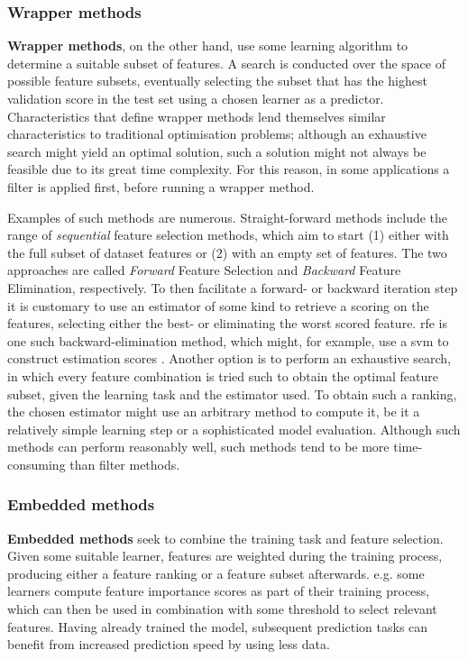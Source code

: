 \documentclass{article}
\begin{document}
\subsubsection{Wrapper methods}
\textbf{Wrapper methods}, on the other hand, use some learning algorithm to determine a suitable subset of features. A search is conducted over the space of possible feature subsets, eventually selecting the subset that has the highest validation score in the test set using a chosen learner as a predictor. Characteristics that define wrapper methods lend themselves similar characteristics to traditional optimisation problems; although an exhaustive search might yield an optimal solution, such a solution might not always be feasible due to its great time complexity. For this reason, in some applications a filter is applied first, before running a wrapper method.

Examples of such methods are numerous. Straight-forward methods include the range of \textit{sequential} feature selection methods, which aim to start (1) either with the full subset of dataset features or (2) with an empty set of features. The two approaches are called \textit{Forward} Feature Selection and \textit{Backward} Feature Elimination, respectively. To then facilitate a forward- or backward iteration step it is customary to use an estimator of some kind to retrieve a scoring on the features, selecting either the best- or eliminating the worst scored feature. \gls{rfe} is one such backward-elimination method, which might, for example, use a \gls{svm} to construct estimation scores \citep{maldonado_weber_2009}. Another option is to perform an exhaustive search, in which every feature combination is tried such to obtain the optimal feature subset, given the learning task and the estimator used. To obtain such a ranking, the chosen estimator might use an arbitrary method to compute it, be it a relatively simple learning step or a sophisticated model evaluation. Although such methods can perform reasonably well, such methods tend to be more time-consuming than filter methods.

\subsubsection{Embedded methods}
\textbf{Embedded methods} seek to combine the training task and feature selection. Given some suitable learner, features are weighted during the training process, producing either a feature ranking or a feature subset afterwards. e.g. some learners compute feature importance scores as part of their training process, which can then be used in combination with some threshold to select relevant features. Having already trained the model, subsequent prediction tasks can benefit from increased prediction speed by using less data.
\end{document}
